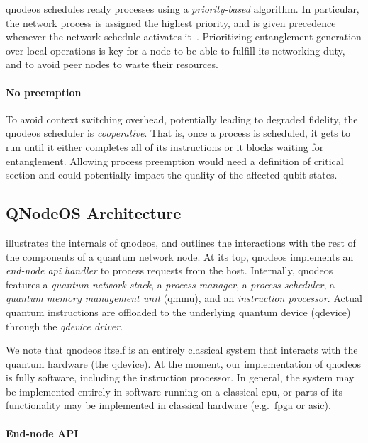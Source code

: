 \acrshort{qnodeos} schedules ready processes using a \emph{priority-based} algorithm. In particular,
the network process is assigned the highest priority, and is given precedence whenever the network
schedule activates it~\cite{skrzypczyk_2021_arch}. Prioritizing entanglement generation over local
operations is key for a node to be able to fulfill its networking duty, and to avoid peer nodes to
waste their resources.

\paragraph{No preemption}

To avoid context switching overhead, potentially leading to degraded fidelity, the
\acrshort{qnodeos} scheduler is \emph{cooperative}. That is, once a process is scheduled, it gets to
run until it either completes all of its instructions or it blocks waiting for entanglement.
Allowing process preemption would need a definition of critical section and could potentially impact
the quality of the affected qubit states.

\subsection{QNodeOS Architecture}

 illustrates the internals of \acrshort{qnodeos}, and outlines the
interactions with the rest of the components of a quantum network node. At its top,
\acrshort{qnodeos} implements an \emph{end-node \acrshort{api} handler} to process requests from the
host. Internally, \acrshort{qnodeos} features a \emph{quantum network stack}, a \emph{process
manager}, a \emph{process scheduler}, a \emph{quantum memory management unit} (\acrshort{qmmu}), and
an \emph{instruction processor}. Actual quantum instructions are offloaded to the underlying quantum
device (\acrshort{qdevice}) through the \emph{\acrshort{qdevice} driver}.

We note that \acrshort{qnodeos} itself is an entirely classical system that interacts with the
quantum hardware (the \acrshort{qdevice}). At the moment, our implementation of \acrshort{qnodeos}
is fully software, including the instruction processor. In general, the system may be implemented
entirely in software running on a classical \acrshort{cpu}, or parts of its functionality may be
implemented in classical hardware (e.g.~\acrshort{fpga} or \acrshort{asic}).

\paragraph{End-node API}

